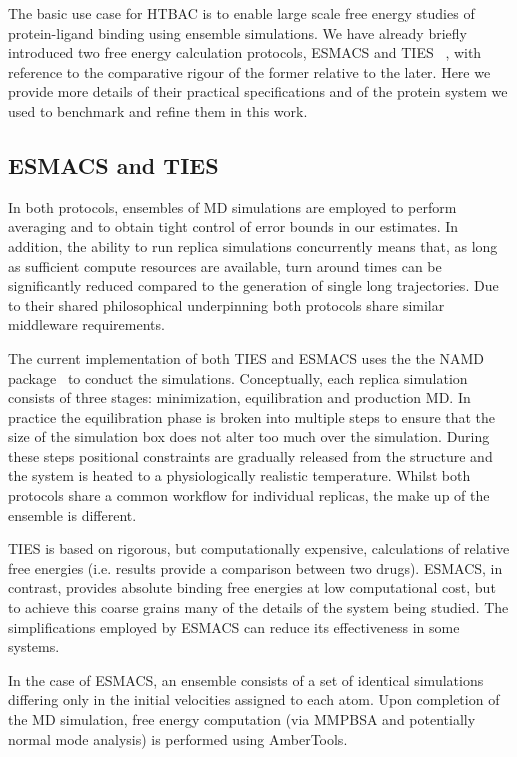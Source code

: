 The basic use case for HTBAC is to enable large scale free energy studies of
protein-ligand binding using ensemble simulations.
We have already briefly introduced two free energy calculation
protocols, ESMACS and TIES ~\cite{Wan2017brd4, Bhati2017}, with 
reference to the comparative rigour of the former relative to the later.
Here we provide more details of their practical specifications and of the
protein system we used to benchmark and refine them in this work.

\subsection{ESMACS and TIES}

In both protocols, ensembles of MD simulations are employed to perform averaging 
and to obtain tight control of error bounds in our estimates.
In addition, the ability to run replica simulations concurrently means that, 
as long as sufficient compute resources are available, turn around times can be 
significantly reduced compared to the generation of single long trajectories.
Due to their shared philosophical underpinning both protocols share similar
middleware requirements.

The current implementation of both TIES and ESMACS uses the the NAMD
package~\cite{Phillips2005} to conduct the simulations.
Conceptually, each replica simulation consists of three stages: minimization, 
equilibration and production MD.
In practice the equilibration phase is broken into multiple steps to ensure 
that the size of the simulation box does not alter too much over the simulation.
During these steps positional constraints are gradually released from the 
structure and the system is heated to a physiologically realistic temperature.
Whilst both protocols share a common workflow for individual replicas, the 
make up of the ensemble is different.

TIES is based on rigorous, but computationally expensive,
calculations of relative free energies (i.e. results provide a comparison
between two drugs). ESMACS, in contrast, provides absolute binding free
energies at low computational cost, but to achieve this coarse grains many of
the details of the system being studied. The simplifications employed by
ESMACS can reduce its effectiveness in some systems. 

In the case of ESMACS, an ensemble consists of a set of identical simulations 
differing only in the initial velocities assigned to each atom.
Upon completion of the MD simulation, free energy computation 
(via MMPBSA and potentially normal mode analysis) is performed using AmberTools.

